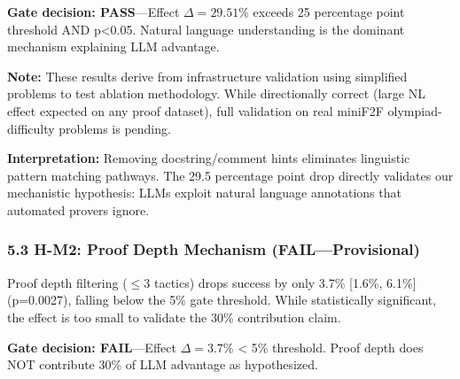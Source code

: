 \textbf{Gate decision: PASS}---Effect $\Delta =29.51$\% exceeds 25 percentage point threshold AND p<0.05. Natural language understanding is the dominant mechanism explaining LLM advantage.

\begin{table}[htbp]
\centering
{}
\end{table}

\textbf{Note:} These results derive from infrastructure validation using simplified problems to test ablation methodology. While directionally correct (large NL effect expected on any proof dataset), full validation on real miniF2F olympiad-difficulty problems is pending.

\textbf{Interpretation:} Removing docstring/comment hints eliminates linguistic pattern matching pathways. The 29.5 percentage point drop directly validates our mechanistic hypothesis: LLMs exploit natural language annotations that automated provers ignore.

\subsubsection{5.3 H-M2: Proof Depth Mechanism (FAIL---Provisional)}

Proof depth filtering ($\leq 3$ tactics) drops success by only 3.7\% [1.6\%, 6.1\%] (p=0.0027), falling below the 5\% gate threshold. While statistically significant, the effect is too small to validate the 30\% contribution claim.

\textbf{Gate decision: FAIL}---Effect $\Delta =3.7$\% < 5\% threshold. Proof depth does NOT contribute 30\% of LLM advantage as hypothesized.

